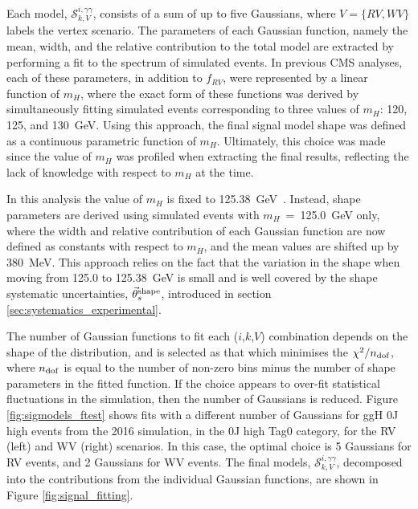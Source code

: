Each model, $\mathcal{S}^{i,\gamma\gamma}_{k,V}$, consists of a sum of up to five Gaussians, where $V=\{RV,WV\}$ labels the vertex scenario. The parameters of each Gaussian function, namely the mean, width, and the relative contribution to the total model are extracted by performing a fit to the \mgg spectrum of simulated events. In previous CMS \Hgg analyses, each of these parameters, in addition to $f_{RV}$, were represented by a linear function of $m_H$, where the exact form of these functions was derived by simultaneously fitting simulated events corresponding to three values of $m_H$: 120, 125, and 130~GeV. Using this approach, the final signal model shape was defined as a continuous parametric function of $m_H$. Ultimately, this choice was made since the value of $m_H$ was profiled when extracting the final results, reflecting the lack of knowledge with respect to $m_H$ at the time. 

In this analysis the value of $m_H$ is fixed to 125.38~GeV~\cite{Sirunyan:2020xwk}. Instead, shape parameters are derived using simulated events with $m_H$~=~125.0~GeV only, where the width and relative contribution of each Gaussian function are now defined as constants with respect to $m_H$, and the mean values are shifted up by 380~MeV. This approach relies on the fact that the variation in the shape when moving from 125.0 to 125.38~GeV is small and is well covered by the shape systematic uncertainties, $\vec{\theta}^{\rm{shape}}_s$, introduced in section \ref{sec:systematics_experimental}.

The number of Gaussian functions to fit each ($i$,$k$,$V$) combination depends on the shape of the \mgg distribution, and is selected as that which minimises the $\chi^2/n_{\rm{dof}}$, where $n_{\rm{dof}}$ is equal to the number of non-zero \mgg bins minus the number of shape parameters in the fitted function. If the choice appears to over-fit statistical fluctuations in the simulation, then the number of Gaussians is reduced. Figure \ref{fig:sigmodels_ftest} shows fits with a different number of Gaussians for ggH 0J high \ptH events from the 2016 simulation, in the 0J high \ptgg Tag0 category, for the RV (left) and WV (right) scenarios. In this case, the optimal choice is 5 Gaussians for RV events, and 2 Gaussians for WV events. The final models, $\mathcal{S}^{i,\gamma\gamma}_{k,V}$, decomposed into the contributions from the individual Gaussian functions, are shown in Figure \ref{fig:signal_fitting}. 

